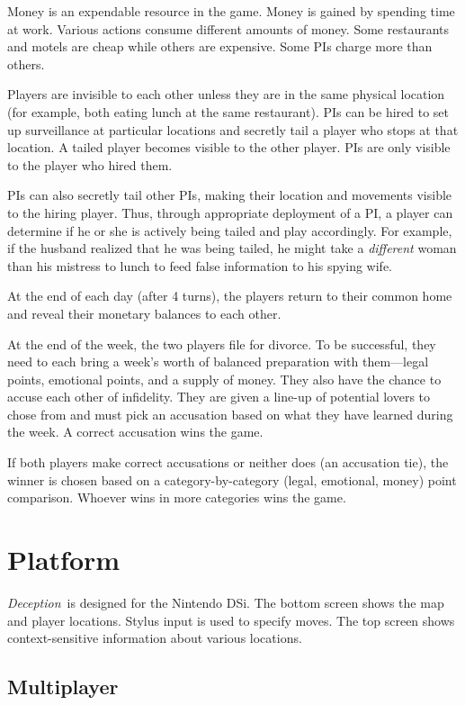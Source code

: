\documentclass[12pt]{article}
\newcommand{\gtitle}{{\it Deception}}
\begin{document}
Money is an expendable resource in the game.  Money is gained by spending time at work.  Various actions consume different amounts of money.  Some restaurants and motels are cheap while others are expensive.  Some PIs charge more than others.

Players are invisible to each other unless they are in the same physical location (for example, both eating lunch at the same restaurant).  PIs can be hired to set up surveillance at particular locations and secretly tail a player who stops at that location.  A tailed player becomes visible to the other player.  PIs are only visible to the player who hired them.

PIs can also secretly tail other PIs, making their location and movements visible to the hiring player.  Thus, through appropriate deployment of a PI, a player can determine if he or she is actively being tailed and play accordingly.  For example, if the husband realized that he was being tailed, he might take a {\it different} woman than his mistress to lunch to feed false information to his spying wife.

At the end of each day (after 4 turns), the players return to their common home and reveal their monetary balances to each other.

At the end of the week, the two players file for divorce.  To be successful, they need to each bring a week's worth of balanced preparation with them---legal points, emotional points, and a supply of money.  They also have the chance to accuse each other of infidelity.  They are given a line-up of potential lovers to chose from and must pick an accusation based on what they have learned during the week.  A correct accusation wins the game.

If both players make correct accusations or neither does (an accusation tie), the winner is chosen based on a category-by-category (legal, emotional, money) point comparison.  Whoever wins in more categories wins the game.

\section{Platform}

\gtitle\ is designed for the Nintendo DSi.  The bottom screen shows the map and player locations.  Stylus input is used to specify moves.  The top screen shows context-sensitive information about various locations.

\subsection{Multiplayer}
\end{document}

